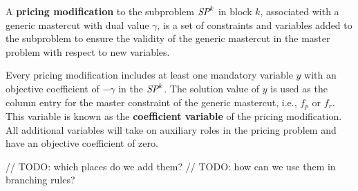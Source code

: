 \begin{definition}
A \textbf{pricing modification} to the subproblem $\SP{k}$ in block $k$, associated with a generic mastercut with dual value $\gamma$, is a set of constraints and variables added to the subproblem to ensure the validity of the generic mastercut in the master problem with respect to new variables.

Every pricing modification includes at least one mandatory variable $y$ with an objective coefficient of $-\gamma$ in the $\SP{k}$. The solution value of $y$ is used as the column entry for the master constraint of the generic mastercut, i.e., $f_p$ or $f_r$. This variable is known as the \textbf{coefficient variable} of the pricing modification. All additional variables will take on auxiliary roles in the pricing problem and have an objective coefficient of zero.
\end{definition}

// TODO: which places do we add them?
// TODO: how can we use them in branching rules?


